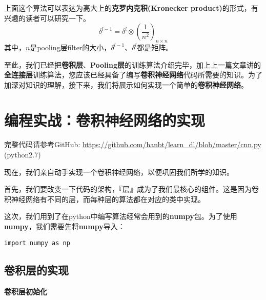 上面这个算法可以表达为高大上的\textbf{克罗内克积(Kronecker product)}的形式，有兴趣的读者可以研究一下。
\[
	\delta^{l-1} = \delta^l\otimes(\frac{1}{n^2})_{n\times n}
\]
其中，\(n\)是pooling层filter的大小，\(\delta^{l-1}\)、\( \delta^l\)都是矩阵。

至此，我们已经把\textbf{卷积层}、\textbf{Pooling层}的训练算法介绍完毕，加上上一篇文章讲的\textbf{全连接层}训练算法，您应该已经具备了编写\textbf{卷积神经网络}代码所需要的知识。为了加深对知识的理解，接下来，我们将展示如何实现一个简单的\textbf{卷积神经网络}。



\section{编程实战：卷积神经网络的实现}\label{Cnn:10}

\begin{note}
	完整代码请参考GitHub: \url{https://github.com/hanbt/learn_dl/blob/master/cnn.py}
	(python2.7)
\end{note}

现在，我们亲自动手实现一个卷积神经网络，以便巩固我们所学的知识。

首先，我们要改变一下代码的架构，『层』成为了我们最核心的组件。这是因为卷积神经网络有不同的层，而每种层的算法都在对应的类中实现。

这次，我们用到了在python中编写算法经常会用到的\textbf{numpy}包。为了使用\textbf{numpy}，我们需要先将\textbf{numpy}导入：
\begin{lstlisting}
import numpy as np
\end{lstlisting}

\subsection{卷积层的实现}\label{Cnn:11}

\textbf{卷积层初始化}

